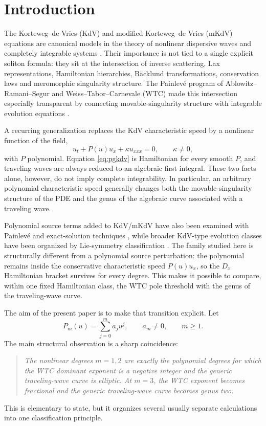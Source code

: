 \documentclass[11pt]{article}
\begin{document}
\section{Introduction}
The Korteweg--de Vries (KdV) and modified Korteweg--de Vries (mKdV) equations are canonical models in the theory of nonlinear dispersive waves and completely integrable systems \citep{korteweg1895,gardner1967,miura1968,ablowitz1981}.  Their importance is not tied to a single explicit soliton formula: they sit at the intersection of inverse scattering, Lax representations, Hamiltonian hierarchies, B\"acklund transformations, conservation laws and meromorphic singularity structure.  The Painlev\'e program of Ablowitz--Ramani--Segur and Weiss--Tabor--Carnevale (WTC) made this intersection especially transparent by connecting movable-singularity structure with integrable evolution equations \citep{ars1980a,ars1980b,weiss1983,weiss1983b,conte1999}.

A recurring generalization replaces the KdV characteristic speed by a nonlinear function of the field,
\begin{equation}
 u_t+P(u)u_x+\kappa u_{xxx}=0,\qquad \kappa\ne0,
 \label{eq:pgkdv}
\end{equation}
with $P$ polynomial.  Equation \eqref{eq:pgkdv} is Hamiltonian for every smooth $P$, and traveling waves are always reduced to an algebraic first integral.  These two facts alone, however, do not imply complete integrability.  In particular, an arbitrary polynomial characteristic speed generally changes both the movable-singularity structure of the PDE and the genus of the algebraic curve associated with a traveling wave.

Polynomial source terms added to KdV/mKdV have also been examined with Painlev\'e and exact-solution techniques \citep{kudryashov2014,kudryashov2016}, while broader KdV-type evolution classes have been organized by Lie-symmetry classification \citep{gungor2004}.  The family studied here is structurally different from a polynomial source perturbation: the polynomial remains inside the conservative characteristic speed $P(u)u_x$, so the $D_x$ Hamiltonian bracket survives for every degree.  This makes it possible to compare, within one fixed Hamiltonian class, the WTC pole threshold with the genus of the traveling-wave curve.

The aim of the present paper is to make that transition explicit.  Let
\begin{equation}
 P_m(u)=\sum_{j=0}^{m}a_j u^j,\qquad a_m\ne0,\qquad m\ge1.
 \label{eq:poly}
\end{equation}
The main structural observation is a sharp coincidence:
\begin{quote}
\emph{The nonlinear degrees $m=1,2$ are exactly the polynomial degrees for which the WTC dominant exponent is a negative integer and the generic traveling-wave curve is elliptic.  At $m=3$, the WTC exponent becomes fractional and the generic traveling-wave curve becomes genus two.}
\end{quote}
This is elementary to state, but it organizes several usually separate calculations into one classification principle.
\end{document}
